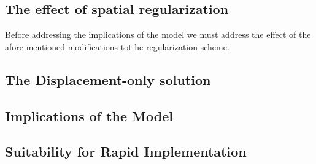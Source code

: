 \subsection{The effect of spatial regularization}
Before addressing the implications of the model we must address the effect of the afore mentioned modifications tot he regularization scheme.

\subsection{The Displacement-only solution}

\subsection{Implications of the Model}

\subsection{Suitability for Rapid Implementation}



